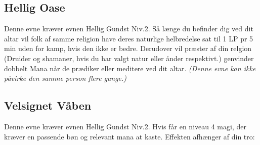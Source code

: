 \subsection{Hellig Oase}
Denne evne kræver evnen Hellig Gundst Niv.2. Så længe du befinder dig ved dit altar vil folk af samme religion have deres naturlige helbredelse sat til 1 LP pr 5 min uden for kamp, hvis den ikke er bedre. Derudover vil præster af din relgion (Druider og shamaner, hvis du har valgt natur eller ånder respektivt.) genvinder dobbelt Mana når de prædiker eller meditere ved dit altar. \textit{(Denne evne kan ikke påvirke den samme person flere gange.)}

\subsection{Velsignet Våben}
Denne evne kræver evnen Hellig Gundst Niv.2. 
Hvis får en niveau 4 magi, der kræver en passende bøn og relevant mana at kaste. Effekten afhænger af din tro:
